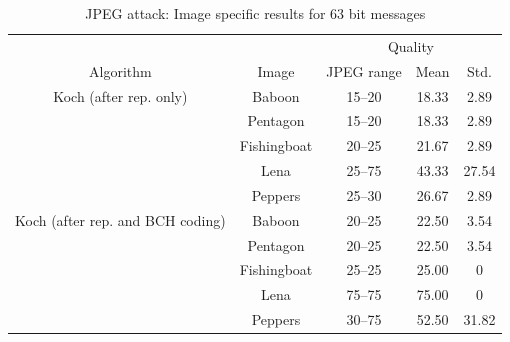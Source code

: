 \documentclass[12pt]{report}
\begin{document}
\begin{table}[!ht]
\tiny
        \begin{center}
                \begin{tabular}{|c|c|c|c|c|} \hline
					& 		& \multicolumn{3}{c|}{Quality} \\ \cline{3-5}
                Algorithm               & Image         & JPEG range & Mean          & Std. \\ \hline\hline
                Koch (after rep. only)  & Baboon        & 15--20                 & 18.33            & 2.89  \\ \cline{2-5}
                			& Pentagon      & 15--20                 & 18.33            & 2.89  \\ \cline{2-5}
                			& Fishingboat   & 20--25                 & 21.67            & 2.89  \\ \cline{2-5}
                			& Lena          & 25--75                 & 43.33            & 27.54  \\ \cline{2-5}
                			& Peppers       & 25--30                 & 26.67            & 2.89  \\ \hline\hline

                Koch (after rep. and BCH coding)  & Baboon      & 20--25                 & 22.50            & 3.54  \\ \cline{2-5}
                				& Pentagon      & 20--25                 & 22.50            & 3.54  \\ \cline{2-5}
                				& Fishingboat   & 25--25                 & 25.00            & 0 \\ \cline{2-5}
                				& Lena          & 75--75                	& 75.00            & 0  \\ \cline{2-5}
                				& Peppers       & 30--75                 & 52.50            & 31.82  \\ \hline
        \end{tabular}
        \caption{JPEG attack: Image specific results for 63 bit messages}
        \label{tab:imgSpecific63BK32_63_148}
        \end{center}
\end{table}
\normalsize

 
\end{document}
